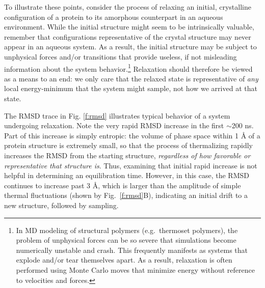To illustrate these points, consider the process of relaxing an initial, crystalline configuration of a protein to its amorphous counterpart in an aqueous environment.
While the initial structure might seem to be intrinsically valuable, remember that configurations representative of the crystal structure may never appear in an aqueous system.
As a result, the initial structure may be subject to unphysical forces and/or transitions that provide useless, if not misleading information about the system behavior.\footnote{In MD modeling of structural polymers (e.g.\ thermoset polymers), the problem of unphysical forces can be so severe that simulations become numerically unstable and crash.  This frequently manifests as systems that explode and/or tear themselves apart.  As a result, relaxation is often performed using Monte Carlo moves that minimize energy without reference to velocities and forces.}
Relaxation should therefore be viewed as a means to an end: we only care that the relaxed state is representative of {\it any} local energy-minimum that the system might sample, not how we arrived at that state.

The RMSD trace in Fig. \ref{f:rmsd} illustrates typical behavior of a system undergoing relaxation.  Note the very rapid RMSD increase in the first $\sim$200 ns. Part of this increase is simply entropic: the volume of phase space within 1 {\AA} of a protein structure is extremely small, so that the process of thermalizing rapidly increases the RMSD from the starting structure, \emph{regardless of how favorable or representative that structure is}.  Thus, examining that initial rapid increase is not helpful in determining an equilibration time.  However, in this case, the RMSD continues to increase past 3 {\AA}, which is larger than the amplitude of simple thermal fluctuations (shown by Fig.\ \ref{f:rmsd}B), indicating an initial drift to a new structure, followed by sampling.

